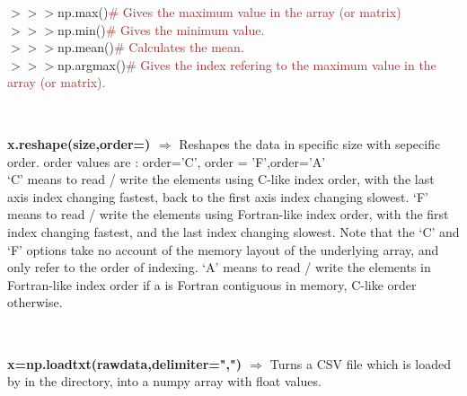 \documentclass[a4paper,18pt]{article}
\begin{document}
$>>>$np.max(){\textcolor{brown}{\# Gives the maximum value in the array (or matrix)}}\\

$>>>$np.min(){\textcolor{brown}{\# Gives the minimum value.}}\\

$>>>$np.mean(){\textcolor{brown}{\# Calculates the mean.}}\\

$>>>$np.argmax(){\textcolor{brown}{\# Gives the index refering to the maximum value in the array (or matrix).}}\\\\


\subsection{\colorbox {matgreen}{\color{white}{\large Reshape}}}
\textbf{x.reshape(size,order=) $\Rightarrow$} Reshapes the data in specific size with sepecific order. order values are : order='C', order = 'F',order='A'\\

 ‘C’ means to read / write the elements using C-like index order, with the last axis index changing fastest, back to the first axis index changing slowest. ‘F’ means to read / write the elements using Fortran-like index order, with the first index changing fastest, and the last index changing slowest. Note that the ‘C’ and ‘F’ options take no account of the memory layout of the underlying array, and only refer to the order of indexing. ‘A’ means to read / write the elements in Fortran-like index order if a is Fortran contiguous in memory, C-like order otherwise.\\\\

\subsection{\colorbox {matgreen}{\color{white}{\large np.loadtxt(rawdata,delimiter=",")}}}
\textbf{x=np.loadtxt(rawdata,delimiter=",") $\Rightarrow$} Turns a CSV file which is loaded by {\colorbox{matgreen}{\color{white}{open(filename,'rt')}}} in the directory, into a numpy array with float values.\\\\
\end{document}
